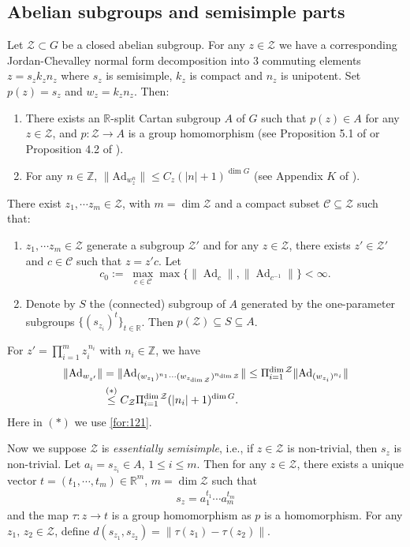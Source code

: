 \documentclass[11 pt]{amsart}
\newcommand{\RR}{\mathbb{R}}
\newcommand{\ZZ}{\mathbb{Z}}
\newcommand{\norm}[1]{\lVert#1\rVert}
\newcommand{\abs}[1]{\lvert#1\rvert}
\theoremstyle{definition}
\numberwithin{equation}{section}
\DeclareMathOperator{\Ad}{Ad}
\begin{document}
\subsection{Abelian subgroups and semisimple parts}\label{for:173}
Let $\mathcal{Z}\subset G$ be a closed abelian subgroup. For any $z\in \mathcal{Z}$ we have a corresponding Jordan-Chevalley normal form decomposition into $3$ commuting elements $z=s_zk_zn_z$ where $s_z$ is semisimple, $k_z$ is compact and $n_z$ is unipotent. Set $p(z)=s_z$ and $w_z=k_zn_z$. Then:
 \begin{enumerate}
   \item There exists an $\RR$-split Cartan subgroup $A$ of $G$ such that $p(z)\in A$ for any $z\in \mathcal{Z}$, and $p: \mathcal{Z}\to A$ is a group homomorphism (see Proposition 5.1 of \cite{W6} or Proposition 4.2 of \cite{vw}).

   \item\label{for:121} For any $n\in\ZZ$, $\norm{\text{Ad}_{w_z^n}}\leq C_z(|n|+1)^{\dim G}$ (see Appendix $K$ of \cite{W6}).
 \end{enumerate}
There exist $z_1,\cdots z_{m}\in \mathcal{Z}$, with $m=\dim \mathcal{Z}$ and a compact subset $\mathcal{C}\subseteq \mathcal{Z}$ such that:
\begin{enumerate}
  \item $z_1,\cdots z_{m}\in \mathcal{Z}$ generate a subgroup $\mathcal{Z}'$ and
for any $z\in \mathcal{Z}$, there exists $z'\in \mathcal{Z}'$ and $c\in \mathcal{C}$ such that $z=z'c$. Let
\[
c_0:=\; \max_{c\in \mathcal{C}}\max\!\bigl\{\|\Ad_c\|,\|\Ad_{c^{-1}}\|\bigr\}<\infty .
\]
  \item Denote by $S$ the (connected) subgroup of $A$ generated by the one-parameter subgroups $\{(s_{z_i})^{t}\}_{t\in\mathbb{R}}$. Then $p(\mathcal{Z})\subseteq S\subseteq A$.
\end{enumerate}
For $z'=\prod_{i=1}^{m} z_i^{\,n_i}$ with $n_i\in\ZZ$, we have
\begin{align}\label{for:122}
 \norm{\text{Ad}_{w_{z'}}}&=\norm{\text{Ad}_{(w_{z_1})^{n_1}\cdots (w_{z_{\dim \mathcal{Z}}})^{n_{\dim \mathcal{Z}}}}}\leq
 \Pi_{i=1}^{\dim \mathcal{Z}}\norm{\text{Ad}_{(w_{z_i})^{n_i}}}\notag\\
 &\overset{(*)}{\leq} C_{\mathcal{Z}} \Pi_{i=1}^{\dim \mathcal{Z}}(\abs{n_i}+1)^{\dim G}.
\end{align}
Here in $(*)$ we use \eqref{for:121}.

Now we suppose $\mathcal{Z}$ is \emph{essentially semisimple}, i.e., if $z\in \mathcal{Z}$ is non-trivial, then $s_{z}$ is non-trivial. Let $a_i=s_{z_i}\in A$, $1\leq i\leq m$. Then for any $z\in \mathcal{Z}$, there exists a unique vector $t=(t_1,\cdots, t_{m})\in\RR^{m}$, $m=\dim\mathcal{Z}$ such that
\begin{align*}
 s_z=a_1^{t_1}\cdots a_{m}^{t_{m}}
\end{align*}
and the map $\tau: z\to t$ is a group homomorphism as  $p$ is a homomorphism.
For any $z_1,\,z_2\in \mathcal{Z}$, define $d(s_{z_1},s_{z_2})=\norm{\tau(z_1)-\tau(z_2)}$.
\end{document}
